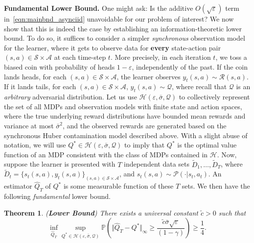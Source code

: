 \documentclass{article}
\newcommand{\mc}{\mathcal}
\newtheorem{theorem}{Theorem}
\begin{document}
\textbf{Fundamental Lower Bound.} One might ask: Is the additive $O(\sqrt{\varepsilon})$ term in~\eqref{eqn:mainbnd_asynciid} unavoidable for our problem of interest? We now show that this is indeed the case by establishing an information-theoretic lower bound. To do so, it suffices to consider a simpler \emph{synchronous} observation model~\cite{kearns, even2003learning, sidford} for the learner, where it gets to observe data for \textbf{every} state-action pair $(s,a) \in \mc{S} \times \mc{A}$ at each time-step $t$. More precisely, in each iteration $t$, we toss a biased coin with probability of heads $1-\varepsilon$, independently of the past. If the coin lands heads, for each $(s,a) \in \mc{S} \times \mc{A}$, the learner observes $y_t(s,a) \sim \mc{R}(s,a)$. If it lands tails, for each $(s,a) \in \mc{S} \times \mc{A}$, $y_t(s,a) \sim \mc{Q}$, where recall that $\mc{Q}$ is an \emph{arbitrary} adversarial distribution. Let us use $\mc{H}(\varepsilon, \bar{\sigma}, \mc{Q})$ to collectively represent the set of all MDPs and observation models with finite state and action spaces, where the true underlying reward distributions have bounded mean rewards and variance at most $\bar{\sigma}^2$, and the observed rewards are generated based on the synchronous Huber contamination model described above. With a slight abuse of notation, we will use $Q^* \in \mc{H}(\varepsilon, \bar{\sigma}, \mc{Q})$ to imply that $Q^*$ is the optimal value function of an MDP consistent with the class of MDPs contained in $\mc{H}$. Now, suppose the learner is presented with $T$ independent data sets $\tilde{D}_1, \ldots, \tilde{D}_T$, where $\tilde{D}_t = \{s_t(s,a), y_t(s,a)\}_{(s,a) \in \mc{S} \times \mc{A}}$, and $s_t(s,a) \sim \mc{P}(\cdot|s_t, a_t).$  An estimator $\hat{Q}_T$ of $Q^*$ is some measurable function of these $T$ sets. We then have the following \emph{fundamental} lower bound.  

\begin{theorem} 
\label{thm:lowerbnd}
(\textbf{Lower Bound}) There exists a universal constant $\tilde{c} >0$ such that
$$ \inf_{\hat{Q}_T} \sup_{Q^* \in \mc{H}(\varepsilon, \bar{\sigma}, \mc{Q})} \mathbb{P}\left( \Vert \hat{Q}_T - Q^* \Vert_{\infty} \geq \frac{\tilde{c} \bar{\sigma} \sqrt{\varepsilon}}{(1-\gamma)}\right) \geq \frac{1}{4}.$$ 
\end{theorem}
\end{document}

